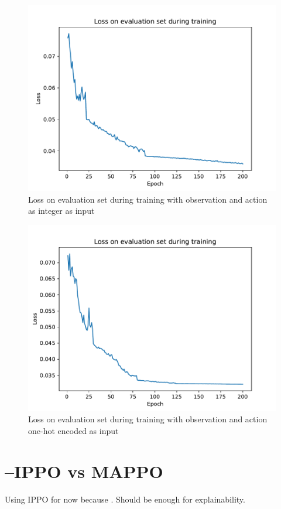 \documentclass[UKenglish]{uiomasterthesis}
\begin{document}
\begin{figure}[!ht]
	\includegraphics[width=\columnwidth]{images/pred_model_action.pdf}
	\caption{Loss on evaluation set during training with observation and action as integer as input}
	\label{fig:pred_loss_action} 
\end{figure}

\begin{figure}[!ht]
	\includegraphics[width=\columnwidth]{images/pred_model_one-hot.pdf}
	\caption{Loss on evaluation set during training with observation and action one-hot encoded as input}
	\label{fig:pred_loss_one-hot} 
\end{figure}

\section{--IPPO vs MAPPO}
Using IPPO for now because \cite{dewitt2020independentlearningneedstarcraft}. Should be enough for explainability.
\end{document}

